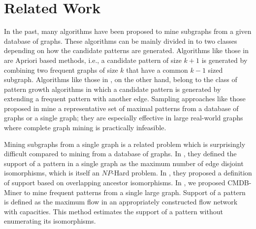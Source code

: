 \section{Related Work} 
\label{sec:relatedwork}

In the past, many algorithms have been proposed to mine subgraphs from a
given database of graphs. These algorithms can be mainly divided in to
two classes depending on how the candidate patterns are generated.
Algorithms like those in \cite{IWM03,FSG01,HWP03} are Apriori
based methods, i.e., a candidate pattern of size $k+1$ is generated by
combining two frequent graphs of size $k$ that have a common $k-1$ sized
subgraph.  Algorithms like those in \cite{gSpan},
on the other hand, belong to the class of pattern growth algorithms in
which a candidate pattern is generated by extending a frequent pattern
with another edge.
Sampling approaches like those proposed in
\cite{2009-graphsampling,2012-kais,RAM2008} mine a representative set of
maximal patterns from a database of graphs or a single graph; they are
especially effective in large real-world graphs where complete graph
mining is practically infeasible.

Mining subgraphs from a single graph is a related problem which is
surprisingly difficult compared to mining from a database of graphs.  In
\cite{kuramochi2005ffp}, they defined the support of a pattern
in a single graph as the maximum number of edge disjoint isomorphisms,
which is itself an $NP$-Hard problem.  In \cite{fiedler2007support}, they
proposed a definition of support based on overlapping ancestor
isomorphisms.  In \cite{2012-kais}, we proposed
CMDB-Miner\xspace to mine frequent patterns from a single large graph.
Support of a pattern is defined as the maximum flow in an appropriately
constructed flow network with capacities. This method estimates the
support of a pattern without enumerating its isomorphisms. 

